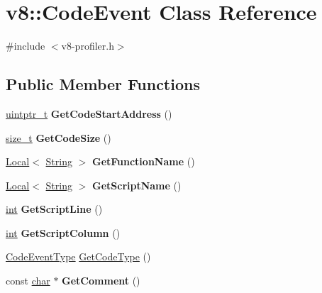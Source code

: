 \hypertarget{classv8_1_1CodeEvent}{}\section{v8\+:\+:Code\+Event Class Reference}
\label{classv8_1_1CodeEvent}


{\ttfamily \#include $<$v8-\/profiler.\+h$>$}

\subsection*{Public Member Functions}
\begin{DoxyCompactItemize}
\item 
\mbox{\label{classv8_1_1CodeEvent_a4018eb2ab6907598649cde071c3e02b7}} 
\mbox{\hyperlink{classuintptr__t}{uintptr\+\_\+t}} {\bfseries Get\+Code\+Start\+Address} ()
\item 
\mbox{\label{classv8_1_1CodeEvent_ad0804f7a64f8bb1545204d6f4ca3d19b}} 
\mbox{\hyperlink{classsize__t}{size\+\_\+t}} {\bfseries Get\+Code\+Size} ()
\item 
\mbox{\label{classv8_1_1CodeEvent_a58b4646a23461832a1263ba5e7b6da14}} 
\mbox{\hyperlink{classv8_1_1Local}{Local}}$<$ \mbox{\hyperlink{classv8_1_1String}{String}} $>$ {\bfseries Get\+Function\+Name} ()
\item 
\mbox{\label{classv8_1_1CodeEvent_acad47ae1d84c4eb88edd7ef89f174537}} 
\mbox{\hyperlink{classv8_1_1Local}{Local}}$<$ \mbox{\hyperlink{classv8_1_1String}{String}} $>$ {\bfseries Get\+Script\+Name} ()
\item 
\mbox{\label{classv8_1_1CodeEvent_afb712b7e49428996ca2dbe56d0beaead}} 
\mbox{\hyperlink{classint}{int}} {\bfseries Get\+Script\+Line} ()
\item 
\mbox{\label{classv8_1_1CodeEvent_af24375d6cf1cf4f959f2458796f9d9dd}} 
\mbox{\hyperlink{classint}{int}} {\bfseries Get\+Script\+Column} ()
\item 
\mbox{\hyperlink{namespacev8_af0ff31131cc32ced9b5279b321569bbc}{Code\+Event\+Type}} \mbox{\hyperlink{classv8_1_1CodeEvent_a3a6507024df2e1e0898c03bc35bbd293}{Get\+Code\+Type}} ()
\item 
\mbox{\label{classv8_1_1CodeEvent_a8e1529fc3b6bde6cb37227d96eb7cdba}} 
const \mbox{\hyperlink{classchar}{char}} $\ast$ {\bfseries Get\+Comment} ()
\end{DoxyCompactItemize}

